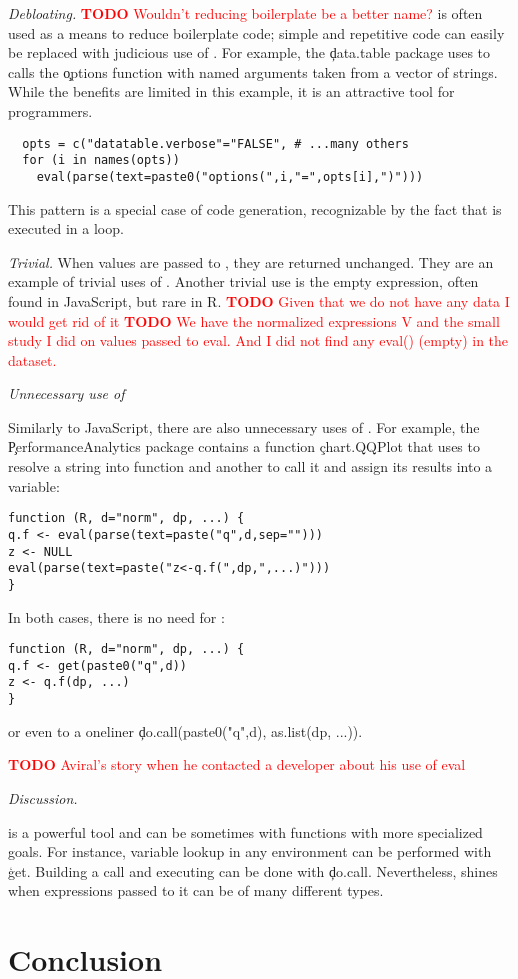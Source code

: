 \documentclass[review,screen,acmsmall,anonymous=true]{acmart}
\newcommand{\mypara}[1]{\medskip\noindent\emph{#1}\xspace}
\newcommand{\authorcomment}[3]{\xspace\textcolor{#1}{{\bf #2} #3}\xspace}
\newcommand{\todo}[1]{\authorcomment{red}{TODO}{#1}}
\begin{document}
\mypara{Debloating.} \todo{Wouldn't reducing boilerplate be a better name?} \Eval is often used as a means to reduce boilerplate code;
simple and repetitive code can easily be replaced with judicious use of \eval.
For example, the \c{data.table} package uses \eval to calls the \c{options}
function with named arguments taken from a vector of strings. While the benefits
are limited in this example, it is an attractive tool for programmers.
\begin{lstlisting}
  opts = c("datatable.verbose"="FALSE", # ...many others
  for (i in names(opts))
    eval(parse(text=paste0("options(",i,"=",opts[i],")")))
\end{lstlisting}
This pattern is a special case of code generation, recognizable by the
fact that \eval is executed in a loop.

\mypara{Trivial.} When values are passed to \eval, they are returned
unchanged. They are an example of trivial uses of \eval. Another
trivial use is the empty expression, often found in JavaScript, but
rare in R. \todo{Given that we do not have any data I would get rid of it}
\todo{We have the normalized expressions V and the small study I did on values passed to eval. And I did not find any eval() (empty) in the dataset. }


\mypara{Unnecessary use of \eval}

Similarly to JavaScript, there are also unnecessary uses of \eval. For example,
the \c{PerformanceAnalytics} package contains a function \c{chart.QQPlot} that
uses \eval to resolve a string into function and another to call it and assign
its results into a variable:
\begin{lstlisting}
function (R, d="norm", dp, ...) {
q.f <- eval(parse(text=paste("q",d,sep="")))
z <- NULL
eval(parse(text=paste("z<-q.f(",dp,",...)")))
}
\end{lstlisting}
  In both cases, there is no need for \eval:
\begin{lstlisting}
function (R, d="norm", dp, ...) {
q.f <- get(paste0("q",d))
z <- q.f(dp, ...)
}
\end{lstlisting}
or even to a oneliner \c{do.call(paste0("q",d), as.list(dp, ...))}.

\todo{Aviral's story when he contacted a developer about his use of eval}

\mypara{Discussion.} %

\eval is a powerful tool and can be sometimes with functions with more specialized goals. For instance, variable lookup in any environment can be performed with \c{get}. Building a call and executing can be done with \c{do.call}. Nevertheless, \eval shines when expressions passed to it can be of many different types. %

\section{Conclusion}


\end{document}
